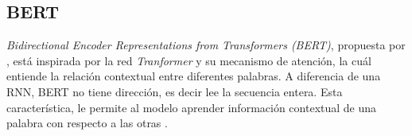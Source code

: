 



\subsection{BERT}

\textit{Bidirectional Encoder Representations from Transformers (BERT)}, propuesta por \cite{devlin2018bert}, está inspirada por la red \textit{Tranformer} y su mecanismo de atención, la cuál entiende la relación contextual entre diferentes palabras. A diferencia de una RNN, BERT no tiene dirección, es decir lee la secuencia entera. Esta característica, le permite al modelo aprender información contextual de una palabra con respecto a las otras \citep{Kelvin_transformer2022}.








